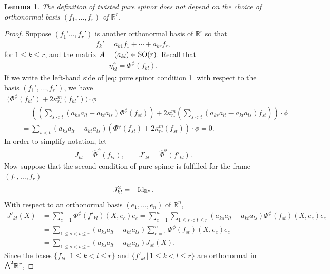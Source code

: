 \documentclass[pdftex]{sigma}
\newcommand{\ext}{\raise1pt\hbox{\small$\bigwedge$}}
\numberwithin{equation}{section}
\newtheorem{Lemma}[Theorem]{Lemma}
\begin{document}
\begin{Lemma}\label{lemma: independent of frame} The definition of twisted pure spinor does not depend on the choice of orthonormal basis $(f_1,\dots,f_r)$ of $\mathbb{R}^r$.
\end{Lemma}
\begin{proof} Suppose $(f_1'\dots,f_r')$ is another orthonormal basis of $\mathbb{R}^r$ so that
\begin{gather*} f_k' = a_{k1}f_1 + \cdots + a_{kr}f_r ,\end{gather*}
for $1\leq k \leq r$, and the matrix $A=(a_{kl})\in {\rm SO}(r)$.
Recall that
\begin{gather*}\eta_{kl}^\phi = \Phi^\phi(f_{kl}).\end{gather*}
If we write the left-hand side of \eqref{eq: pure spinor condition 1}
 with respect to the basis $(f_1',\dots,f_r')$, we have
\begin{gather*}
 \big(\Phi^\phi(f_{kl}') + 2\kappa_{r_*}^m (f_{kl}')\big)\cdot \phi\\
 \qquad{} = \left(\left(\sum_{s< t}(a_{ks}a_{lt} -a_{kt}a_{ls})
\Phi^\phi(f_{st})\right) + 2\kappa_{r_*}^m \left(\sum_{s< t}(a_{ks}a_{lt} -a_{kt}a_{ls})
f_{st}\right) \right) \cdot \phi\\
\qquad{} = \sum_{s< t}(a_{ks}a_{lt} -a_{kt}a_{ls})
(\Phi^\phi(f_{st}) + 2\kappa_{r_*}^m (f_{st})) \cdot \phi = 0.
\end{gather*}
In order to simplify notation, let
\begin{gather*}
 J_{kl} = \hat\Phi^\phi(f_{kl}), \qquad J'_{kl} = \hat\Phi^\phi(f'_{kl}).
\end{gather*}
Now suppose that the second condition of pure spinor is fulfilled for the frame $(f_1,\dots ,f_r)$
\begin{gather*}
J_{kl}^2= -{\rm Id}_{\mathbb{R}^n}.\end{gather*}
With respect to an orthonormal basis $(e_1,\dots,e_n)$ of $\mathbb{R}^n$,
\begin{align}
J'_{kl}(X) &= \sum_{c=1}^n \Phi^\phi (f'_{kl})(X,e_c)e_c= \sum_{c=1}^n \sum_{1\leq s< t\leq r}(a_{ks}a_{lt} -a_{kt}a_{ls})
\Phi^\phi(f_{st})(X,e_c)e_c\nonumber\\
 &= \sum_{1\leq s< t\leq r}(a_{ks}a_{lt} -a_{kt}a_{ls})\sum_{c=1}^n\Phi^\phi(f_{st})(X,e_c)e_c\nonumber\\
 &= \sum_{1\leq s< t\leq r}(a_{ks}a_{lt} -a_{kt}a_{ls}) \label{eq:J' and J}
J_{st}(X).
\end{align}
Since the bases $\{f_{kl}\,|\,1\leq k< l\leq r\}$ and $\{f'_{kl}\,|\,1\leq k< l\leq r\}$ are orthonormal in $\ext^2 \mathbb{R}^r$,

\end{proof}
\end{document}
